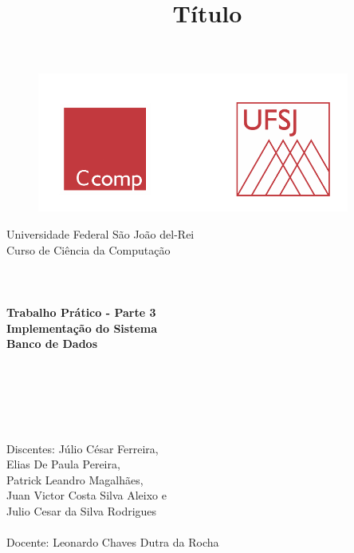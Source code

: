 \documentclass[a4paper, 12pt]{article}
\begin{document}

\begin{titlepage}
	\begin{center}
	
	\begin{figure}[ht]
    \centering
    \includegraphics[width=.44\textwidth]{Images/LogoUFSJ.PNG}
    \label{fig:Capturar.PNG}
    \end{figure}

    	\Huge{Universidade Federal São João del-Rei}\\
		\Large{Curso de Ciência da Computação}\\ 

        \vspace{82pt}
        \textbf{\LARGE{
        \\
        \\
        \\
        Trabalho Prático - Parte 3\\
        Implementação do Sistema\\
        \vspace{0.5cm}
        \Large{Banco de Dados}
        \\
        \\
        \\
        }}
        
		\title{{\large{Título}}}
		\vspace{1cm}
	\end{center}
	    
    \begin{flushleft}
		\begin{tabbing}
		\\
		\\
		\\	
		\large{Discentes: Júlio César Ferreira,}\\ 
		\large{\hspace{2.35cm}Elias De Paula Pereira},\\
		\large{\hspace{2.35cm}Patrick Leandro Magalhães},\\
		\large{\hspace{2.35cm}Juan Victor Costa Silva Aleixo} e\\
		\large{\hspace{2.35cm}Julio Cesar da Silva Rodrigues}\\
	    \\
		\large{Docente: Leonardo Chaves Dutra da Rocha}\\
	    \end{tabbing}
    \end{flushleft}
	\vspace{0.8cm}
	

\end{titlepage}
\end{document}
